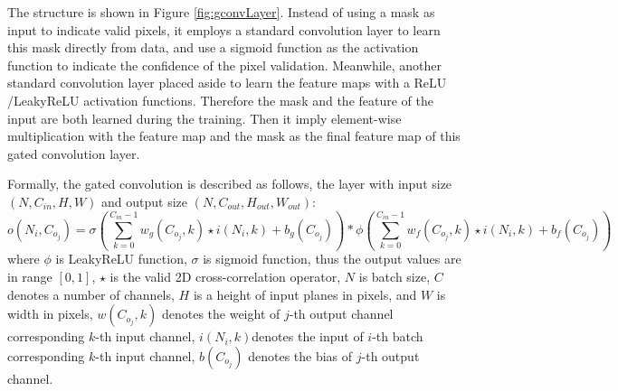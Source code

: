 The structure is shown in Figure \ref{fig:gconvLayer}. Instead of using a mask as input to indicate valid pixels, it employs a standard convolution layer to learn this mask directly from data, and use a sigmoid function as the activation function to indicate the confidence of the pixel validation. Meanwhile, another standard convolution layer placed aside to learn the feature maps with a ReLU /LeakyReLU activation functions. Therefore the mask and the feature of the input are both learned during the training.  Then it imply element-wise multiplication with the feature map and the mask as the final feature map of this gated convolution layer. 

Formally, the gated convolution is described as follows, the layer with input size $ (N, C_{in}, H, W) $ and output size $ (N, C_{out}, H_{out}, W_{out}) $:
\begin{equation}\label{gconv}
	o(N_i, C_{o_j}) = \sigma(\sum_{k=0}^{C_{in}-1}w_g(C_{o_j}, k) \star i(N_i,k) + b_g(C_{o_j})) * 
	\phi (\sum_{k=0}^{C_{in}-1}w_f(C_{o_j}, k) \star i(N_i,k) + b_f(C_{o_j}))
\end{equation}
where $ \phi $ is LeakyReLU function, $ \sigma $ is sigmoid function, thus the output values are in range $ [0,1] $, $ \star $ is the valid 2D cross-correlation operator, $ N $ is batch size, $ C $ denotes a number of channels, $ H $ is a height of input planes in pixels, and $ W $ is width in pixels, $ w(C_{o_j},k) $ denotes the weight of $ j $-th output channel corresponding $ k $-th input channel, $ i(N_i, k) $denotes the input of $ i $-th batch corresponding $ k $-th input channel, $ b(C_{o_j}) $ denotes the bias of $ j $-th output channel.


